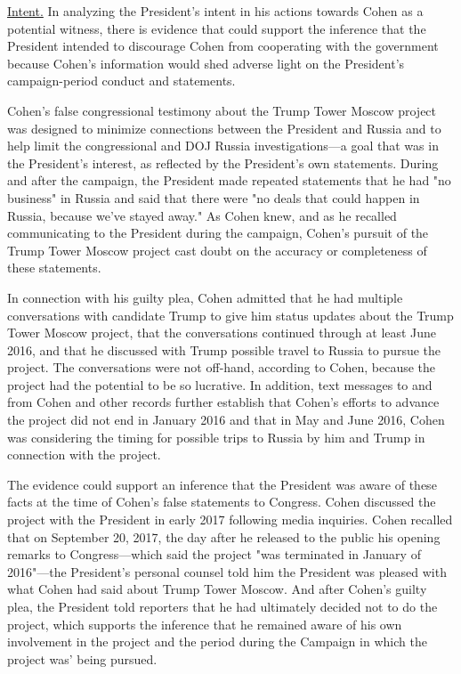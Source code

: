 {\underline{Intent.}
In analyzing the President's intent in his actions towards Cohen as a potential witness, there is evidence that could support the inference that the President intended to discourage Cohen from cooperating with the government because Cohen's information would shed adverse light on the President's campaign-period conduct and statements.

Cohen's false congressional testimony about the Trump Tower Moscow project was designed to minimize connections between the President and Russia and to help limit the congressional and DOJ Russia investigations---a goal that was in the President's interest, as reflected by the President's own statements.
During and after the campaign, the President made repeated statements that he had "no business" in Russia and said that there were "no deals that could happen in Russia, because we've stayed away."
As Cohen knew, and as he recalled communicating to the President during the campaign, Cohen's pursuit of the Trump Tower Moscow project cast doubt on the accuracy or completeness of these statements.

In connection with his guilty plea, Cohen admitted that he had multiple conversations with candidate Trump to give him status updates about the Trump Tower Moscow project, that the conversations continued through at least June 2016, and that he discussed with Trump possible travel to Russia to pursue the project.
The conversations were not off-hand, according to Cohen, because the project had the potential to be so lucrative.
In addition, text messages to and from Cohen and other records further establish that Cohen's efforts to advance the project did not end in January 2016 and that in May and June 2016, Cohen was considering the timing for possible trips to Russia by him and Trump in connection with the project.

The evidence could support an inference that the President was aware of these facts at the time of Cohen's false statements to Congress.
Cohen discussed the project with the President in early 2017 following media inquiries.
Cohen recalled that on September 20, 2017, the day after he released to the public his opening remarks to Congress---which said the project "was terminated in January of 2016"---the President's personal counsel told him the President was pleased with what Cohen had said about Trump Tower Moscow.
And after Cohen's guilty plea, the President told reporters that he had ultimately decided not to do the project, which supports the inference that he remained aware of his own involvement in the project and the period during the Campaign in which the project was' being pursued.

}
